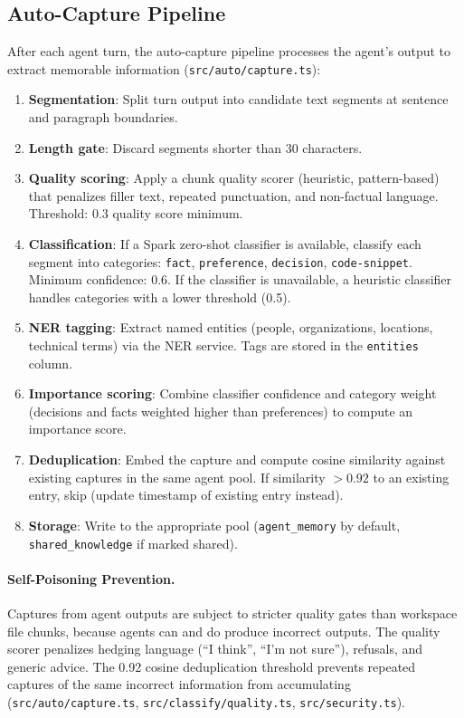 \documentclass[11pt]{article}
\begin{document}
\subsection{Auto-Capture Pipeline}
\label{sec:arch:capture}

After each agent turn, the auto-capture pipeline processes the agent's output to extract
memorable information (\texttt{src/auto/capture.ts}):

\begin{enumerate}[leftmargin=2em, itemsep=3pt]
  \item \textbf{Segmentation}: Split turn output into candidate text segments at sentence
  and paragraph boundaries.
  \item \textbf{Length gate}: Discard segments shorter than 30 characters.
  \item \textbf{Quality scoring}: Apply a chunk quality scorer (heuristic, pattern-based)
  that penalizes filler text, repeated punctuation, and non-factual language. Threshold:
  0.3 quality score minimum.
  \item \textbf{Classification}: If a Spark zero-shot classifier is available, classify
  each segment into categories: \texttt{fact}, \texttt{preference}, \texttt{decision},
  \texttt{code-snippet}. Minimum confidence: 0.6. If the classifier is unavailable, a
  heuristic classifier handles categories with a lower threshold (0.5).
  \item \textbf{NER tagging}: Extract named entities (people, organizations, locations,
  technical terms) via the NER service. Tags are stored in the \texttt{entities} column.
  \item \textbf{Importance scoring}: Combine classifier confidence and category weight
  (decisions and facts weighted higher than preferences) to compute an importance score.
  \item \textbf{Deduplication}: Embed the capture and compute cosine similarity against
  existing captures in the same agent pool. If similarity $> 0.92$ to an existing entry,
  skip (update timestamp of existing entry instead).
  \item \textbf{Storage}: Write to the appropriate pool (\texttt{agent\_memory} by
  default, \texttt{shared\_knowledge} if marked shared).
\end{enumerate}

\paragraph{Self-Poisoning Prevention.}
Captures from agent outputs are subject to stricter quality gates than workspace file
chunks, because agents can and do produce incorrect outputs. The quality scorer penalizes
hedging language (``I think'', ``I'm not sure''), refusals, and generic advice. The
0.92 cosine deduplication threshold prevents repeated captures of the same incorrect
information from accumulating (\texttt{src/auto/capture.ts},
\texttt{src/classify/quality.ts}, \texttt{src/security.ts}).
\end{document}
